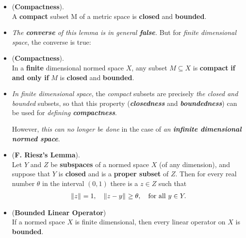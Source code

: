 \documentclass[11pt]{article}
\begin{document}
\begin{itemize}
\item \begin{lemma} (\textbf{Compactness}). \\
A \textbf{compact} subset M of a metric space is \textbf{closed} and \textbf{bounded}.
\end{lemma}

\item \begin{remark}
\emph{The \textbf{converse} of this lemma is in general \textbf{false}.} But for \emph{finite dimensional space}, the converse is true:
\end{remark}

\item \begin{theorem} (\textbf{Compactness}). \citep{kreyszig1989introductory}\\
In a \textbf{finite} dimensional normed space $X$, any subset $M \subseteq X$ is \textbf{compact} \textbf{if and only if} $M$ is \textbf{closed} and \textbf{bounded}.
\end{theorem}

\item \begin{remark}
\emph{In finite dimensional space}, the \emph{compact} subsets are precisely \emph{the closed and bounded} subsets, so that this property (\emph{\textbf{closedness}} and \emph{\textbf{boundedness}}) can be used for \emph{defining \textbf{compactness}}. 

However, \emph{this can no longer be done} in the case of \emph{an \textbf{infinite dimensional normed space}}.
\end{remark}

\item \begin{lemma} (\textbf{F. Riesz's Lemma}). \citep{kreyszig1989introductory}\\
Let $Y$ and $Z$ be \textbf{subspaces} of a normed space $X$ (of any dimension), and suppose that $Y$ is \textbf{closed} and is a \textbf{proper subset} of $Z$. Then for every real number $\theta$ in the interval $(0,1)$ there is a $z \in Z$ such that
\begin{align*}
\left\|z\right\|_{} = 1, \quad \left\|z - y\right\|_{} \ge \theta,\quad \text{for all }y \in Y.
\end{align*}
\end{lemma}

\item \begin{theorem} (\textbf{Bounded Linear Operator})\\
If a normed space $X$ is finite dimensional, then every linear operator on $X$ is \textbf{bounded}.
\end{theorem}
\end{itemize}
\end{document}
